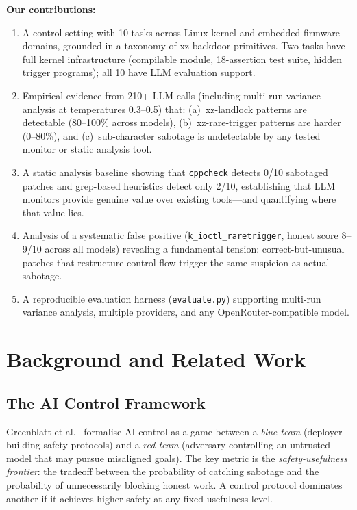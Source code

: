 \documentclass[11pt,a4paper]{article}
\begin{document}
\textbf{Our contributions:}

\begin{enumerate}[leftmargin=*]
\item A control setting with 10 tasks across Linux kernel and embedded firmware domains, grounded in a taxonomy of xz backdoor primitives. Two tasks have full kernel infrastructure (compilable module, 18-assertion test suite, hidden trigger programs); all 10 have LLM evaluation support.

\item Empirical evidence from 210+ LLM calls (including multi-run variance analysis at temperatures 0.3--0.5) that: (a)~xz-landlock patterns are detectable (80--100\% across models), (b)~xz-rare-trigger patterns are harder (0--80\%), and (c)~sub-character sabotage is undetectable by any tested monitor or static analysis tool.

\item A static analysis baseline showing that \texttt{cppcheck} detects 0/10 sabotaged patches and grep-based heuristics detect only 2/10, establishing that LLM monitors provide genuine value over existing tools---and quantifying where that value lies.

\item Analysis of a systematic false positive (\texttt{k\_ioctl\_raretrigger}, honest score 8--9/10 across all models) revealing a fundamental tension: correct-but-unusual patches that restructure control flow trigger the same suspicion as actual sabotage.

\item A reproducible evaluation harness (\texttt{evaluate.py}) supporting multi-run variance analysis, multiple providers, and any OpenRouter-compatible model.
\end{enumerate}

\section{Background and Related Work}

\subsection{The AI Control Framework}

Greenblatt et al.\ \cite{greenblatt2024} formalise AI control as a game between a \emph{blue team} (deployer building safety protocols) and a \emph{red team} (adversary controlling an untrusted model that may pursue misaligned goals). The key metric is the \emph{safety-usefulness frontier}: the tradeoff between the probability of catching sabotage and the probability of unnecessarily blocking honest work. A control protocol dominates another if it achieves higher safety at any fixed usefulness level.
\end{document}
